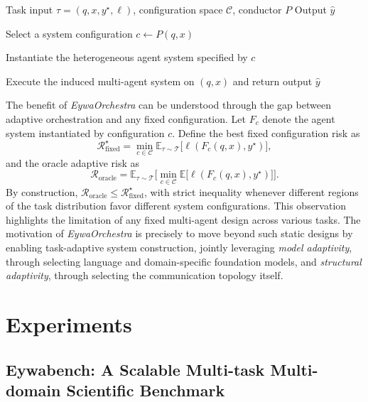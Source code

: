 \documentclass{llmxive}
\begin{document}
{\begin{algorithm}[t]
\caption{EywaOrchestra: Dynamic Orchestration of Heterogeneous Experts}
\label{alg:eywaorchestra}
\begin{algorithmic}[1]
\REQUIRE Task input $\tau = (q, x, y^\star, \ell)$, configuration space $\mathcal{C}$, conductor $P$
\ENSURE Output $\hat{y}$

\STATE Select a system configuration $c \leftarrow P(q,x)$

\STATE Instantiate the heterogeneous agent system specified by $c$

\STATE Execute the induced multi-agent system on $(q,x)$ and return output $\hat{y}$
\end{algorithmic}
\end{algorithm}

The benefit of \textit{EywaOrchestra} can be understood through the gap between adaptive orchestration and any fixed configuration. Let $F_c$ denote the agent system instantiated by configuration $c$. Define the best fixed configuration risk as
\begin{equation}
\mathcal{R}_{\mathrm{fixed}}^\star
=
\min_{c\in\mathcal{C}}
\mathbb{E}_{\tau\sim\mathcal{T}}
\big[\ell(F_c(q,x),y^\star)\big],
\end{equation}
and the oracle adaptive risk as
\begin{equation}
\mathcal{R}_{\mathrm{oracle}}
=
\mathbb{E}_{\tau\sim\mathcal{T}}
\Big[
\min_{c\in\mathcal{C}}
\mathbb{E}\big[\ell(F_c(q,x),y^\star)\big]
\Big].
\end{equation}
By construction, $\mathcal{R}_{\mathrm{oracle}} \le \mathcal{R}_{\mathrm{fixed}}^\star$, with strict inequality whenever different regions of the task distribution favor different system configurations. This observation highlights the limitation of any fixed multi-agent design across various tasks. The motivation of \textit{EywaOrchestra} is precisely to move beyond such static designs by enabling task-adaptive system construction, jointly leveraging \emph{model adaptivity}, through selecting language and domain-specific foundation models, and \emph{structural adaptivity}, through selecting the communication topology itself.

\section{Experiments}
\label{sec:experiment}


\subsection{Eywabench: A Scalable Multi-task Multi-domain Scientific Benchmark}

}
\end{document}
